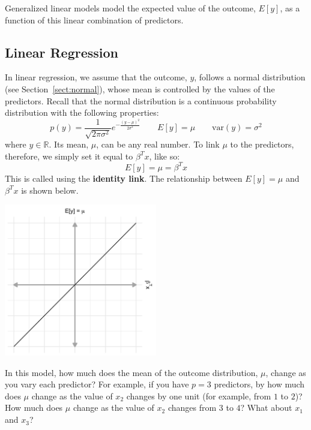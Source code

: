 Generalized linear models model the expected value of the outcome, $E[y]$, as a function of this linear combination of predictors.

\subsection{Linear Regression}

In linear regression, we assume that the outcome, $y$, follows a normal distribution (see Section~\ref{sect:normal}), whose mean is controlled by the values of the predictors. Recall that the normal distribution is a continuous probability distribution with the following properties:
$$ p(y) = \frac{1}{\sqrt{2 \pi \sigma^2}} e^{-\frac{(y-\mu)^2}{2 \sigma^2}} \qquad  E[y] = \mu \qquad \text{var}(y) = \sigma^2 $$
where $y \in \mathbb{R}$. Its mean, $\mu$, can be any real number. To link $\mu$ to the predictors, therefore, we simply set it equal to $\beta^Tx$, like so:
\begin{equation} E[y] = \mu = \beta^T x \label{eqn:meanlinear} \end{equation}
This is called using the \textbf{identity link}. The relationship between $E[y] = \mu$ and $\beta^T x$ is shown below.

\begin{center}
\includegraphics[width=0.5\textwidth]{img/l02-figure1-linreg.png}
\end{center}

\vspace{3mm}

\begin{question}{}
In this model, how much does the mean of the outcome distribution, $\mu$, change as you vary each predictor? For example, if you have $p=3$ predictors, by how much does $\mu$ change as the value of $x_2$ changes by one unit (for example, from $1$ to $2$)? How much does $\mu$ change as the value of $x_2$ changes from $3$ to $4$? What about $x_1$ and $x_3$?
\end{question}

